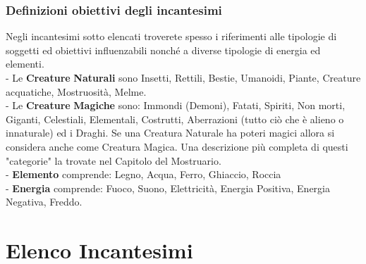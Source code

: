 \documentclass[12pt,a4paper,twoside,openany]{book}
\begin{document}
\begin{multicols}{2}
\subsubsection{Definizioni obiettivi degli incantesimi}\label{magiedefinizioniobiettivi}

Negli incantesimi sotto elencati troverete spesso i riferimenti alle tipologie di soggetti ed obiettivi influenzabili nonché a diverse tipologie di energia ed elementi.\\

- Le \textbf{Creature} \textbf{Naturali} sono Insetti, Rettili, Bestie, Umanoidi, Piante, Creature acquatiche, Mostruosità, Melme.\\

- Le \textbf{Creature} \textbf{Magiche} sono: Immondi (Demoni), Fatati, Spiriti, Non morti, Giganti, Celestiali, Elementali, Costrutti, Aberrazioni (tutto ciò che è alieno o innaturale) ed i  Draghi.
Se una Creatura Naturale ha poteri magici allora si considera anche come Creatura Magica. Una descrizione più completa di questi "categorie" la trovate nel Capitolo del Mostruario.\\

- \textbf{Elemento} comprende: Legno, Acqua, Ferro, Ghiaccio, Roccia\\

- \textbf{Energia} comprende: Fuoco, Suono, Elettricità, Energia Positiva, Energia Negativa, Freddo.


\end{multicols}

\pagebreak

\section{Elenco Incantesimi}
\end{document}
